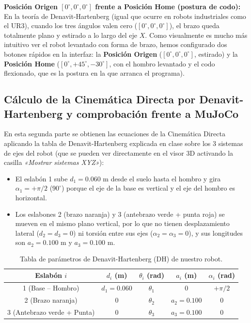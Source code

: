 \documentclass[11pt,a4paper]{article}
\begin{document}
\textbf{Posición Origen $[0^\circ, 0^\circ, 0^\circ]$ frente a Posición Home (postura de codo):}
En la teoría de Denavit-Hartenberg (igual que ocurre en robots industriales como el UR3), cuando los tres ángulos valen cero ($[0^\circ, 0^\circ, 0^\circ]$), el brazo queda totalmente plano y estirado a lo largo del eje $X$. Como visualmente es mucho más intuitivo ver el robot levantado con forma de brazo, hemos configurado dos botones rápidos en la interfaz: la \textbf{Posición Origen} ($[0^\circ, 0^\circ, 0^\circ]$, estirado) y la \textbf{Posición Home} ($[0^\circ, +45^\circ, -30^\circ]$, con el hombro levantado y el codo flexionado, que es la postura en la que arranca el programa).

\subsection{Cálculo de la Cinemática Directa por Denavit-Hartenberg y comprobación frente a MuJoCo}
En esta segunda parte se obtienen las ecuaciones de la Cinemática Directa aplicando la tabla de Denavit-Hartenberg explicada en clase sobre los 3 sistemas de ejes del robot (que se pueden ver directamente en el visor 3D activando la casilla \textit{«Mostrar sistemas XYZ»}):
\begin{itemize}
    \item El eslabón 1 sube $d_1 = 0.060\text{ m}$ desde el suelo hasta el hombro y gira $\alpha_1 = +\pi/2$ ($90^\circ$) porque el eje de la base es vertical y el eje del hombro es horizontal.
    \item Los eslabones 2 (brazo naranja) y 3 (antebrazo verde + punta roja) se mueven en el mismo plano vertical, por lo que no tienen desplazamiento lateral ($d_2 = d_3 = 0$) ni torsión entre sus ejes ($\alpha_2 = \alpha_3 = 0$), y sus longitudes son $a_2 = 0.100\text{ m}$ y $a_3 = 0.100\text{ m}$.
\end{itemize}

\begin{table}[H]
    \centering
    \caption{Tabla de parámetros de Denavit-Hartenberg (DH) de nuestro robot.}
    \label{tab:dh}
    \begin{tabular}{ccccc}
        \toprule
        \textbf{Eslabón $i$} & \textbf{$d_i$ (m)} & \textbf{$\theta_i$ (rad)} & \textbf{$a_i$ (m)} & \textbf{$\alpha_i$ (rad)} \\
        \midrule
        1 (Base -- Hombro) & $d_1 = 0.060$ & $\theta_1$ & $0$ & $+\pi/2$ \\
        2 (Brazo naranja) & $0$ & $\theta_2$ & $a_2 = 0.100$ & $0$ \\
        3 (Antebrazo verde + Punta) & $0$ & $\theta_3$ & $a_3 = 0.100$ & $0$ \\
        \bottomrule
    \end{tabular}
\end{table}
\end{document}
